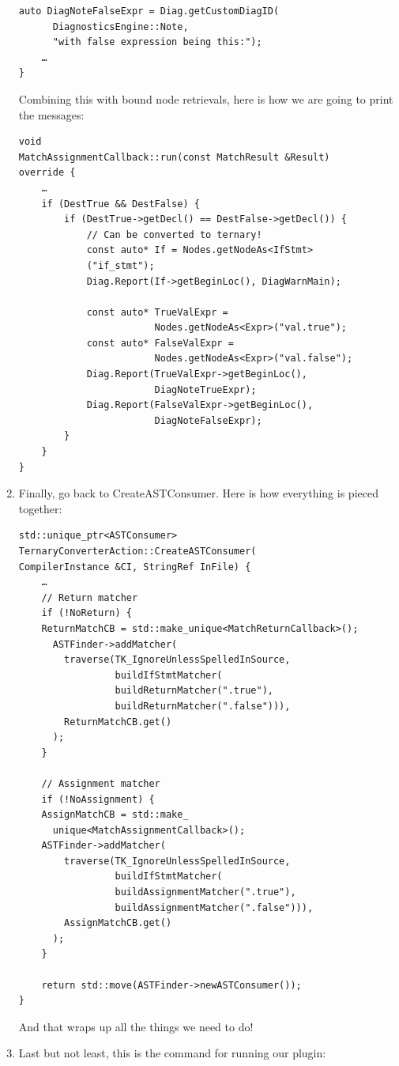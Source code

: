 \begin{enumerate}
\begin{lstlisting}[style=styleCXX]
	auto DiagNoteFalseExpr = Diag.getCustomDiagID(
	  DiagnosticsEngine::Note,
	  "with false expression being this:");
	…
}
\end{lstlisting}

Combining this with bound node retrievals, here is how we are going to print the messages:

\begin{lstlisting}[style=styleCXX]
void
MatchAssignmentCallback::run(const MatchResult &Result)
override {
	…
	if (DestTrue && DestFalse) {
		if (DestTrue->getDecl() == DestFalse->getDecl()) {
			// Can be converted to ternary!
			const auto* If = Nodes.getNodeAs<IfStmt>
			("if_stmt");
			Diag.Report(If->getBeginLoc(), DiagWarnMain);
			
			const auto* TrueValExpr =
			            Nodes.getNodeAs<Expr>("val.true");
			const auto* FalseValExpr =
			            Nodes.getNodeAs<Expr>("val.false");
			Diag.Report(TrueValExpr->getBeginLoc(),
			            DiagNoteTrueExpr);
			Diag.Report(FalseValExpr->getBeginLoc(),
			            DiagNoteFalseExpr);
		}
	}
}
\end{lstlisting}

\item Finally, go back to CreateASTConsumer. Here is how everything is pieced together:

\begin{lstlisting}[style=styleCXX]
std::unique_ptr<ASTConsumer>
TernaryConverterAction::CreateASTConsumer(
CompilerInstance &CI, StringRef InFile) {
	…
	// Return matcher
	if (!NoReturn) {
	ReturnMatchCB = std::make_unique<MatchReturnCallback>();
      ASTFinder->addMatcher(
	    traverse(TK_IgnoreUnlessSpelledInSource,
	             buildIfStmtMatcher(
	             buildReturnMatcher(".true"),
	             buildReturnMatcher(".false"))),
	    ReturnMatchCB.get()
	  );
 	}

	// Assignment matcher
	if (!NoAssignment) {
	AssignMatchCB = std::make_
	  unique<MatchAssignmentCallback>();
	ASTFinder->addMatcher(
	    traverse(TK_IgnoreUnlessSpelledInSource,
	             buildIfStmtMatcher(
	             buildAssignmentMatcher(".true"),
	             buildAssignmentMatcher(".false"))),
	    AssignMatchCB.get()
	  );
	}

	return std::move(ASTFinder->newASTConsumer());
}
\end{lstlisting}

And that wraps up all the things we need to do!

\item Last but not least, this is the command for running our plugin:


\end{enumerate}
